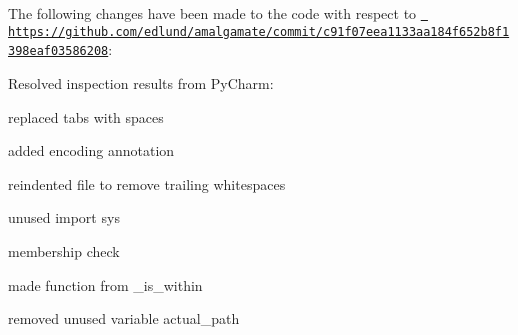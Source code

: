 The following changes have been made to the code with respect to \href{https://github.com/edlund/amalgamate/commit/c91f07eea1133aa184f652b8f1398eaf03586208}{\texttt{ https\+://github.\+com/edlund/amalgamate/commit/c91f07eea1133aa184f652b8f1398eaf03586208}}\+:


\begin{DoxyItemize}
\item Resolved inspection results from Py\+Charm\+:
\begin{DoxyItemize}
\item replaced tabs with spaces
\item added encoding annotation
\item reindented file to remove trailing whitespaces
\item unused import {\ttfamily sys}
\item membership check
\item made function from {\ttfamily \+\_\+is\+\_\+within}
\item removed unused variable {\ttfamily actual\+\_\+path} 
\end{DoxyItemize}
\end{DoxyItemize}